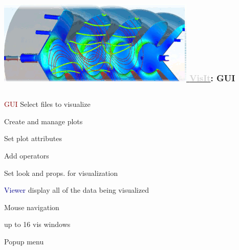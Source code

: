 \begin{frame}
\frametitle{\href{https://wci.llnl.gov/simulation/computer-codes/visit/}{\href{https://wci.llnl.gov/simulation/computer-codes/visit/}{\includegraphics[height=.875cm]{figs/visit-logos/VisIt-02}} {\bf \textcolor{lightgray}{VisIt}}}: GUI}

\begin{columns}
\begin{column}{5.5cm}
\pause
\begin{beamerboxesrounded}[upper=block head,lower=block body,shadow=true]{  \textcolor{DarkRed}{GUI} }
        \textcolor{DarkRed}{} Select files to visualize

        \textcolor{DarkRed}{} Create and manage plots

        \textcolor{DarkRed}{} Set plot attributes

        \textcolor{DarkRed}{} Add operators

        \textcolor{DarkRed}{} Set look and props. for visualization
\end{beamerboxesrounded}
\pause
\begin{beamerboxesrounded}[upper=block head,lower=block body,shadow=true]{ \textcolor{DarkBlue}{Viewer} }
        \textcolor{DarkBlue}{} display all of the data being visualized

        \textcolor{DarkBlue}{} Mouse navigation

        \textcolor{DarkBlue}{} up to 16 vis windows

        \textcolor{DarkBlue}{} Popup menu


\end{beamerboxesrounded}
\end{column}
\end{columns}
\end{frame}
